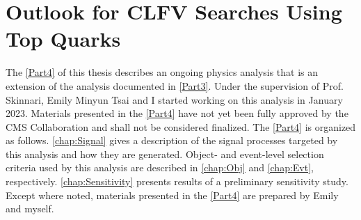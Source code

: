 \part{Outlook for CLFV Searches Using Top Quarks}
\label{Part4}
The \autoref{Part4} of this thesis describes an ongoing physics analysis that is an extension of the analysis documented in \autoref{Part3}. Under the supervision of Prof. Skinnari, Emily Minyun Tsai and I started working on this analysis in January 2023. Materials presented in the \autoref{Part4} have not yet been fully approved by the \ac{CMS} Collaboration and shall not be considered finalized. The \autoref{Part4} is organized as follows. \autoref{chap:Signal} gives a description of the signal processes targeted by this analysis and how they are generated. Object- and event-level selection criteria used by this analysis are described in \autoref{chap:Obj} and \autoref{chap:Evt}, respectively. \autoref{chap:Sensitivity} presents results of a preliminary sensitivity study. Except where noted, materials presented in the \autoref{Part4} are prepared by Emily and myself.




